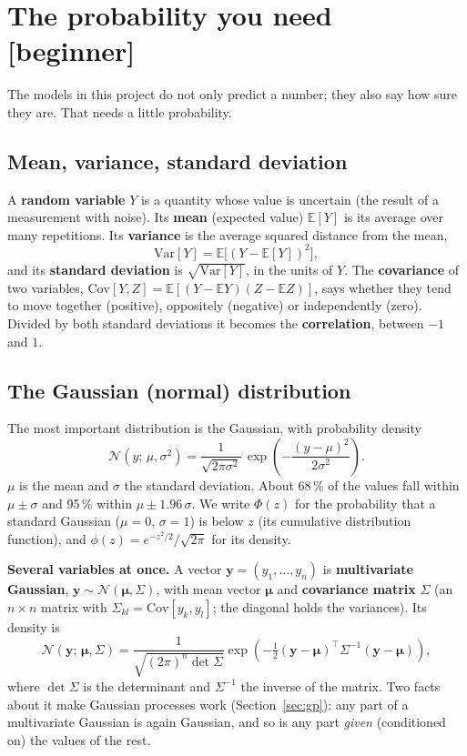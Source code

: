 \documentclass[11pt]{article}
\newcommand{\level}[1]{\hfill{\normalfont\small\color{black!60}[#1]}}
\newcommand{\E}{\mathbb{E}}
\newcommand{\Var}{\mathrm{Var}}
\newcommand{\Cov}{\mathrm{Cov}}
\newcommand{\N}{\mathcal{N}}
\begin{document}
\section{The probability you need \level{beginner}}
\label{sec:prob}

The models in this project do not only predict a number; they also say how sure they are. That needs a little probability.

\subsection{Mean, variance, standard deviation}
A \textbf{random variable} $Y$ is a quantity whose value is uncertain (the result of a measurement with noise). Its
\textbf{mean} (expected value) $\E[Y]$ is its average over many repetitions. Its \textbf{variance} is the average squared
distance from the mean,
\begin{equation}
\Var[Y] = \E\bigl[(Y - \E[Y])^2\bigr],
\end{equation}
and its \textbf{standard deviation} is $\sqrt{\Var[Y]}$, in the units of $Y$. The \textbf{covariance} of two variables,
$\Cov[Y, Z] = \E[(Y - \E Y)(Z - \E Z)]$, says whether they tend to move together (positive), oppositely (negative) or
independently (zero). Divided by both standard deviations it becomes the \textbf{correlation}, between $-1$ and $1$.

\subsection{The Gaussian (normal) distribution}
The most important distribution is the Gaussian, with probability density
\begin{equation}
\N(y;\,\mu, \sigma^2) = \frac{1}{\sqrt{2\pi\sigma^2}}\,\exp\!\left(-\frac{(y-\mu)^2}{2\sigma^2}\right).
\label{eq:gauss}
\end{equation}
$\mu$ is the mean and $\sigma$ the standard deviation. About 68\,\% of the values fall within $\mu \pm \sigma$ and 95\,\% within
$\mu \pm 1.96\,\sigma$. We write $\Phi(z)$ for the probability that a standard Gaussian ($\mu = 0$, $\sigma = 1$) is below $z$
(its cumulative distribution function), and $\phi(z) = e^{-z^2/2}/\sqrt{2\pi}$ for its density.

\textbf{Several variables at once.} A vector $\bm y = (y_1, \dots, y_n)$ is \textbf{multivariate Gaussian},
$\bm y \sim \N(\bm\mu, \Sigma)$, with mean vector $\bm\mu$ and \textbf{covariance matrix} $\Sigma$ (an $n\times n$ matrix with
$\Sigma_{kl} = \Cov[y_k, y_l]$; the diagonal holds the variances). Its density is
\begin{equation}
\N(\bm y;\,\bm\mu, \Sigma) = \frac{1}{\sqrt{(2\pi)^n \det\Sigma}}\exp\!\left(-\tfrac12(\bm y-\bm\mu)^\top\Sigma^{-1}(\bm y-\bm\mu)\right),
\label{eq:mvn}
\end{equation}
where $\det\Sigma$ is the determinant and $\Sigma^{-1}$ the inverse of the matrix. Two facts about it make Gaussian processes
work (Section~\ref{sec:gp}): any part of a multivariate Gaussian is again Gaussian, and so is any part \emph{given} (conditioned
on) the values of the rest.
\end{document}
